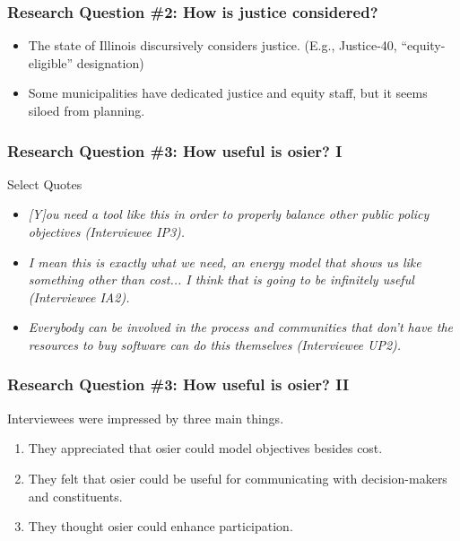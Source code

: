 \begin{frame}
    \frametitle{Research Question \#2: How is justice considered?}

    \begin{itemize}[<+->]
        \item The state of Illinois discursively considers justice. (E.g., Justice-40, ``equity-eligible'' designation)
        \item Some municipalities have dedicated justice and equity staff, but it seems siloed from planning.
    \end{itemize}

\end{frame}

\begin{frame}
    \frametitle{Research Question \#3: How useful is \gls{osier}? I}

    \begin{block}{Select Quotes}
        \begin{itemize}[<+,3>]
            \item   \textit{[Y]ou need a tool like this in order to properly balance other
                        public policy objectives (Interviewee IP3).}  
            \item \textit{I mean this is exactly what we need, an energy model that shows us
                        like something other than cost... I think that is going to be infinitely
                        useful (Interviewee IA2).}
            \item \textit{Everybody can be involved in the process and communities that don’t
                        have the resources to buy software can do this themselves (Interviewee UP2).}
        \end{itemize}
    \end{block}
\end{frame}

\begin{frame}
    \frametitle{Research Question \#3: How useful is \gls{osier}? II}
    Interviewees were impressed by three main things. 
    \begin{enumerate}[<+->]
        \item They appreciated that \gls{osier} could model objectives besides cost.
        \item They felt that \gls{osier} could be useful for communicating with decision-makers and constituents.
        \item They thought \gls{osier} could enhance participation.
    \end{enumerate}
    
\end{frame}

